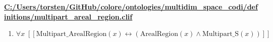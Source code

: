 \documentclass{article}
\begin{document}
\textbf{\url{C:/Users/torsten/GitHub/colore/ontologies/multidim\_space\_codi/definitions/multipart\_areal\_region.clif}}

\begin{enumerate}
\item $\forall x\;  \left[ \left[ \textrm{Multipart\_ArealRegion}(x) \leftrightarrow \left(\textrm{ArealRegion}(x) \land \textrm{Multipart\_S}(x)\right) \right] \right]$
\end{enumerate}
\end{document}
